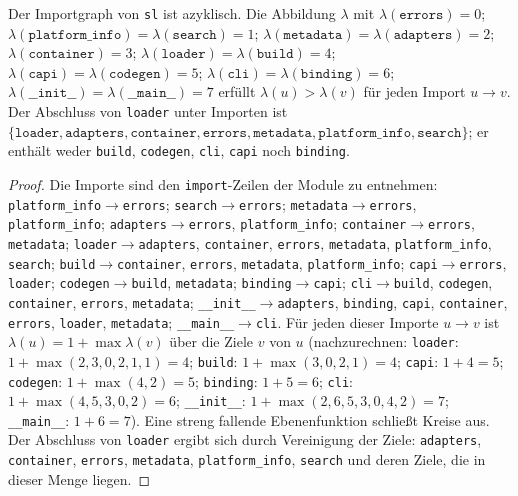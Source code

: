 \begin{satz}
	\label{satz:schichten}
	Der Importgraph von \texttt{sl} ist azyklisch. Die Abbildung $\lambda$ mit $\lambda(\texttt{errors})=0$; $\lambda(\texttt{platform\_info})=\lambda(\texttt{search})=1$; $\lambda(\texttt{metadata})=\lambda(\texttt{adapters})=2$; $\lambda(\texttt{container})=3$; $\lambda(\texttt{loader})=\lambda(\texttt{build})=4$; $\lambda(\texttt{capi})=\lambda(\texttt{codegen})=5$; $\lambda(\texttt{cli})=\lambda(\texttt{binding})=6$; $\lambda(\texttt{\_\_init\_\_})=\lambda(\texttt{\_\_main\_\_})=7$ erfüllt $\lambda(u)>\lambda(v)$ für jeden Import $u\to v$. Der Abschluss von \texttt{loader} unter Importen ist $\{\texttt{loader},\texttt{adapters},\texttt{container},\texttt{errors},\texttt{metadata},\texttt{platform\_info},\texttt{search}\}$; er enthält weder \texttt{build}, \texttt{codegen}, \texttt{cli}, \texttt{capi} noch \texttt{binding}.
\end{satz}

\begin{proof}
	Die Importe sind den \texttt{import}-Zeilen der Module zu entnehmen: \texttt{platform\_info}$\to$\texttt{errors}; \texttt{search}$\to$\texttt{errors}; \texttt{metadata}$\to$\texttt{errors}, \texttt{platform\_info}; \texttt{adapters}$\to$\texttt{errors}, \texttt{platform\_info}; \texttt{container}$\to$\texttt{errors}, \texttt{metadata}; \texttt{loader}$\to$\texttt{adapters}, \texttt{container}, \texttt{errors}, \texttt{metadata}, \texttt{platform\_info}, \texttt{search}; \texttt{build}$\to$\texttt{container}, \texttt{errors}, \texttt{metadata}, \texttt{platform\_info}; \texttt{capi}$\to$\texttt{errors}, \texttt{loader}; \texttt{codegen}$\to$\texttt{build}, \texttt{metadata}; \texttt{binding}$\to$\texttt{capi}; \texttt{cli}$\to$\texttt{build}, \texttt{codegen}, \texttt{container}, \texttt{errors}, \texttt{metadata}; \texttt{\_\_init\_\_}$\to$\texttt{adapters}, \texttt{binding}, \texttt{capi}, \texttt{container}, \texttt{errors}, \texttt{loader}, \texttt{metadata}; \texttt{\_\_main\_\_}$\to$\texttt{cli}. Für jeden dieser Importe $u\to v$ ist $\lambda(u)=1+\max\lambda(v)$ über die Ziele $v$ von $u$ (nachzurechnen: \texttt{loader}: $1+\max(2,3,0,2,1,1)=4$; \texttt{build}: $1+\max(3,0,2,1)=4$; \texttt{capi}: $1+4=5$; \texttt{codegen}: $1+\max(4,2)=5$; \texttt{binding}: $1+5=6$; \texttt{cli}: $1+\max(4,5,3,0,2)=6$; \texttt{\_\_init\_\_}: $1+\max(2,6,5,3,0,4,2)=7$; \texttt{\_\_main\_\_}: $1+6=7$). Eine streng fallende Ebenenfunktion schließt Kreise aus. Der Abschluss von \texttt{loader} ergibt sich durch Vereinigung der Ziele: \texttt{adapters}, \texttt{container}, \texttt{errors}, \texttt{metadata}, \texttt{platform\_info}, \texttt{search} und deren Ziele, die in dieser Menge liegen.
\end{proof}

